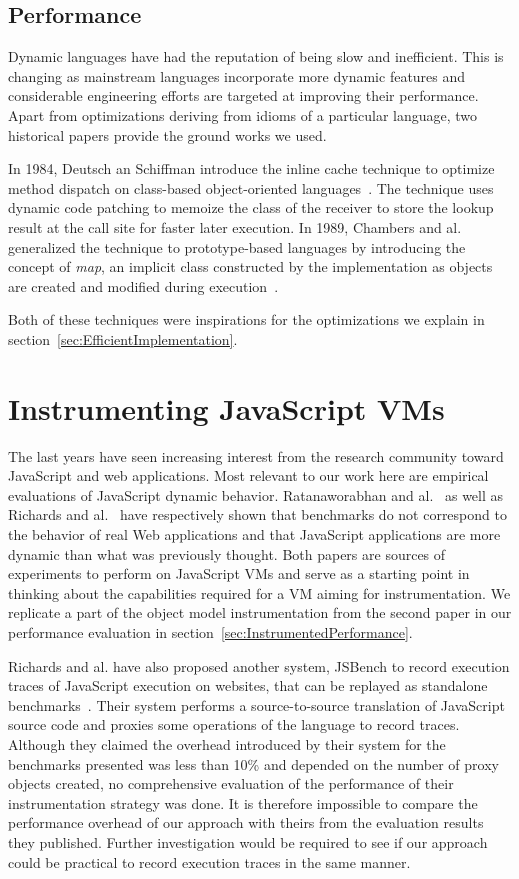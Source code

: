 \subsection{Performance}

Dynamic languages have had the reputation of being slow and inefficient. This
is changing as mainstream languages incorporate more dynamic features and
considerable engineering efforts are targeted at improving their performance.
Apart from optimizations deriving from idioms of a particular language, two
historical papers provide the ground works we used.

In 1984, Deutsch an Schiffman introduce the inline cache technique to optimize
method dispatch on class-based object-oriented languages~\cite{Deutsch:1984}.
The technique uses dynamic code patching to memoize the class of the receiver
to store the lookup result at the call site for faster later execution. In
1989, Chambers and al. generalized the technique to prototype-based languages
by introducing the concept of \textit{map}, an implicit class constructed by
the implementation as objects are created and modified during
execution~\cite{self}.

Both of these techniques were inspirations for the optimizations we explain in
section~\ref{sec:EfficientImplementation}.

\section{Instrumenting JavaScript VMs}
The last years have seen increasing interest from the research community toward
JavaScript and web applications. Most relevant to our work here are empirical
evaluations of JavaScript dynamic behavior. Ratanaworabhan and
al.~\cite{jsmeter} as well as Richards and al.~\cite{behavior_js} have
respectively shown that benchmarks do not correspond to the behavior of real
Web applications and that JavaScript applications are more dynamic than what
was previously thought. Both papers are sources of experiments to perform on
JavaScript VMs and serve as a starting point in thinking about the capabilities
required for a VM aiming for instrumentation. We replicate a part of the object
model instrumentation from the second paper in our performance evaluation in
section~\ref{sec:InstrumentedPerformance}.

Richards and al. have also proposed another system, JSBench to record execution
traces of JavaScript execution on websites, that can be replayed as standalone
benchmarks~\cite{Richards:2011}. Their system performs a source-to-source
translation of JavaScript source code and proxies some operations of the
language to record traces. Although they claimed the overhead introduced by
their system for the benchmarks presented was less than 10\% and depended on
the number of proxy objects created, no comprehensive evaluation of the
performance of their instrumentation strategy was done. It is therefore
impossible to compare the performance overhead of our approach with theirs from
the evaluation results they published. Further investigation would be required
to see if our approach could be practical to record execution traces in the
same manner.

